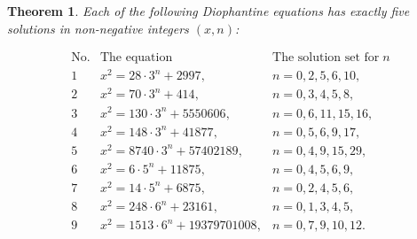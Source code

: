 \documentclass[10pt]{amsart}
\theoremstyle{plain}
\newtheorem{thm}{Theorem}[section]
\begin{document}
\begin{thm}
Each of the following Diophantine equations has exactly five solutions in non-negative integers $(x,n)$:
\begin{center}
\begin{equation*}
\begin{array}{l|lll}
\mbox{No.}&         \mbox{The equation}        & \mbox{The solution set for}\;n\\
\hline
 1 &  x^2=28\cdot 3^{n}+2997,        & n=0, 2, 5, 6, 10,                  \\
 2 &  x^2=70\cdot 3^{n}+414,         & n=0, 3, 4, 5, 8,                    \\
 3 &  x^2=130\cdot 3^{n}+5550606,    & n=0, 6, 11, 15, 16,                  \\
 4 &  x^2=148\cdot 3^{n}+41877,      & n=0, 5, 6, 9, 17,                   \\
 5 &  x^2=8740\cdot 3^{n}+57402189,  & n=0 , 4 ,  9, 15, 29 ,             \\
 6 &  x^2=6\cdot 5^{n}+11875,        & n=0, 4, 5, 6, 9,                      \\
 7 &  x^2=14\cdot 5^{n}+6875,        & n=0, 2, 4, 5, 6,                      \\
 8 &  x^2=248\cdot 6^{n}+23161,      & n=0, 1, 3, 4, 5, \\
 9 &  x^2=1513\cdot 6^n+19379701008, & n=0, 7, 9, 10, 12. \\
  \end{array}
  \end{equation*}
\end{center}
\end{thm}
\end{document}
